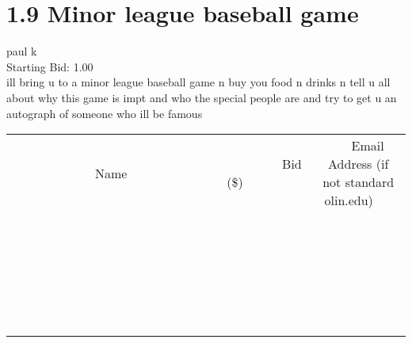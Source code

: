 \documentclass[11pt]{article}
\begin{document}
					\section*{1.9 Minor league baseball game}
					paul k \\
					Starting Bid: 1.00 \\
					ill bring u to a minor league baseball game n buy you food n drinks n tell u all about why this game is impt and who the special people are and try to get u an autograph of someone who ill be famous \\
					[6ex]
					\begin{tabular}{c c c}
						~~~~~~~~~~~~~Name~~~~~~~~~~~~~ & ~~~~~~~~~Bid (\$)~~~~~~~~~ & ~~~Email Address (if not standard olin.edu)~~~ \\
				
 & & \\
\hline
 & & \\
\hline
 & & \\
\hline
 & & \\
\hline
 & & \\
\hline
 & & \\
\hline
 & & \\
\hline
 & & \\
\hline
 & & \\
\hline
 & & \\
\hline
 & & \\
\hline
 & & \\
\hline
 & & \\
\hline
 & & \\
\hline
 & & \\
\hline
 & & \\
\hline
 & & \\
\hline
 & & \\
\hline
 & & \\
\hline
 & & \\
\hline
 & & \\
\hline
 & & \\
\hline
 & & \\
\hline
 & & \\
\hline
 & & \\
\hline
 & & \\
\hline
					\end{tabular}
					\clearpage
				
\end{document}
